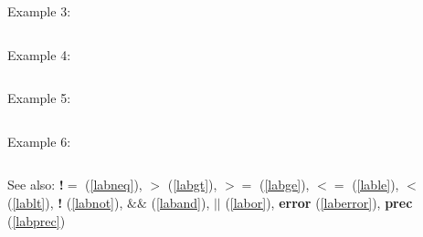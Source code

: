 \noindent Example 3: 
\begin{center}\begin{minipage}{15cm}\begin{Verbatim}[frame=single]
\end{Verbatim}
\end{minipage}\end{center}
\noindent Example 4: 
\begin{center}\begin{minipage}{15cm}\begin{Verbatim}[frame=single]
\end{Verbatim}
\end{minipage}\end{center}
\noindent Example 5: 
\begin{center}\begin{minipage}{15cm}\begin{Verbatim}[frame=single]
\end{Verbatim}
\end{minipage}\end{center}
\noindent Example 6: 
\begin{center}\begin{minipage}{15cm}\begin{Verbatim}[frame=single]
\end{Verbatim}
\end{minipage}\end{center}
See also: \textbf{!$=$} (\ref{labneq}), \textbf{$>$} (\ref{labgt}), \textbf{$>=$} (\ref{labge}), \textbf{$<=$} (\ref{lable}), \textbf{$<$} (\ref{lablt}), \textbf{!} (\ref{labnot}), \textbf{$\&\&$} (\ref{laband}), \textbf{$||$} (\ref{labor}), \textbf{error} (\ref{laberror}), \textbf{prec} (\ref{labprec})
